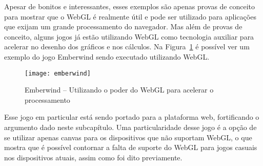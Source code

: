 Apesar de bonitos e interessantes, esses exemplos são apenas provas de
conceito para mostrar que o WebGL é realmente útil e pode ser
utilizado para aplicações que exijam um grande processamento do
navegador. Mas além de provas de conceito, alguns jogos já estão
utilizando WebGL como tecnologia auxiliar para acelerar no desenho dos
gráficos e nos cálculos.
Na Figura~\ref{img:emberwind} é possível ver um exemplo do jogo Emberwind
sendo executado utilizando WebGL.

\begin{figure}[H]
  \centering
	\texttt{[image: emberwind]}
  \caption{Emberwind {--} Utilizando o poder do WebGL para acelerar o processamento}
  \label{img:emberwind}
\end{figure}

Esse jogo em particular está sendo portado para a plataforma web,
fortificando o argumento dado neste subcapítulo. Uma particularidade
desse jogo é a opção de se utilizar apenas canvas para os dispositivos
que não suportam WebGL, o que mostra que é possível contornar a falta
de suporte do WebGL para jogos casuais nos dispositivos atuais, assim
como foi dito previamente.

\clearpage
